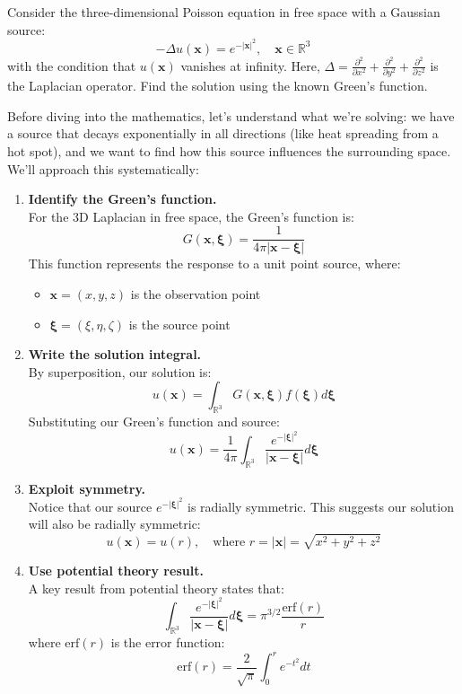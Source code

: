 \exampleline
\begin{example}
Consider the three-dimensional Poisson equation in free space with a Gaussian source:
\[
-\Delta u(\mathbf{x}) = e^{-|\mathbf{x}|^2}, \quad \mathbf{x} \in \mathbb{R}^3
\]
with the condition that \(u(\mathbf{x})\) vanishes at infinity. Here, \(\Delta = \frac{\partial^2}{\partial x^2} + \frac{\partial^2}{\partial y^2} + \frac{\partial^2}{\partial z^2}\) is the Laplacian operator. Find the solution using the known Green's function.

\begin{solution}
Before diving into the mathematics, let's understand what we're solving: we have a source that decays exponentially in all directions (like heat spreading from a hot spot), and we want to find how this source influences the surrounding space. We'll approach this systematically:

\begin{enumerate}
\item \textbf{Identify the Green's function.} \\
For the 3D Laplacian in free space, the Green's function is:
\[
G(\mathbf{x},\boldsymbol{\xi}) = \frac{1}{4\pi|\mathbf{x}-\boldsymbol{\xi}|}
\]
This function represents the response to a unit point source, where:
\begin{itemize}
   \item \(\mathbf{x} = (x,y,z)\) is the observation point
   \item \(\boldsymbol{\xi} = (\xi,\eta,\zeta)\) is the source point
\end{itemize}

\item \textbf{Write the solution integral.} \\
By superposition, our solution is:
\[
u(\mathbf{x}) = \int_{\mathbb{R}^3} G(\mathbf{x},\boldsymbol{\xi})f(\boldsymbol{\xi})d\boldsymbol{\xi}
\]
Substituting our Green's function and source:
\[
u(\mathbf{x}) = \frac{1}{4\pi} \int_{\mathbb{R}^3} \frac{e^{-|\boldsymbol{\xi}|^2}}{|\mathbf{x}-\boldsymbol{\xi}|}d\boldsymbol{\xi}
\]

\item \textbf{Exploit symmetry.} \\
Notice that our source \(e^{-|\boldsymbol{\xi}|^2}\) is radially symmetric. This suggests our solution will also be radially symmetric:
\[
u(\mathbf{x}) = u(r), \quad \text{where } r = |\mathbf{x}| = \sqrt{x^2 + y^2 + z^2}
\]

\item \textbf{Use potential theory result.} \\
A key result from potential theory states that:
\[
\int_{\mathbb{R}^3} \frac{e^{-|\boldsymbol{\xi}|^2}}{|\mathbf{x}-\boldsymbol{\xi}|}d\boldsymbol{\xi} = \pi^{3/2}\frac{\text{erf}(r)}{r}
\]
where \(\text{erf}(r)\) is the error function:
\[
\text{erf}(r) = \frac{2}{\sqrt{\pi}}\int_0^r e^{-t^2}dt
\]


\end{enumerate}
\end{solution}
\end{example}
